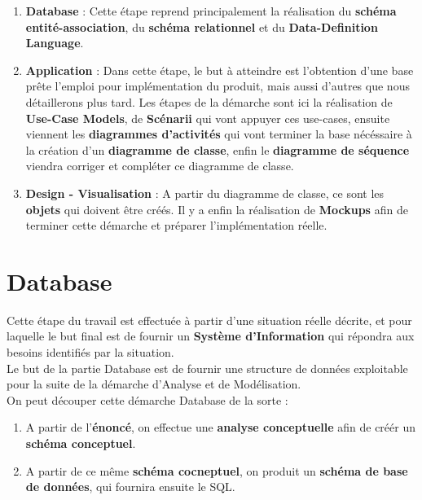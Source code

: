 \documentclass{report}
\begin{document}
		\begin{enumerate}
			\item \textbf{Database} : Cette étape reprend principalement la réalisation du \textbf{schéma entité-association}, du \textbf{schéma relationnel} et du \textbf{Data-Definition Language}.
			\item \textbf{Application} : Dans cette étape, le but à atteindre est l'obtention d'une base prête l'emploi pour implémentation du produit, mais aussi d'autres que nous détaillerons plus tard. Les étapes de la démarche sont ici la réalisation de \textbf{Use-Case Models}, de \textbf{Scénarii} qui vont appuyer ces use-cases, ensuite viennent les \textbf{diagrammes d'activités} qui vont terminer la base nécéssaire à la création d'un \textbf{diagramme de classe}, enfin le \textbf{diagramme de séquence} viendra corriger et compléter ce diagramme de classe.\\
			\item \textbf{Design - Visualisation} : A partir du diagramme de classe, ce sont les \textbf{objets} qui doivent être créés. Il y a enfin la réalisation de \textbf{Mockups} afin de terminer cette démarche et préparer l'implémentation réelle.\\
		\end{enumerate}


\chapter{Database}

	Cette étape du travail est effectuée à partir d'une situation réelle décrite, et pour laquelle le but final est de fournir un \textbf{Système d'Information} qui répondra aux besoins identifiés par la situation.\\

	Le but de la partie Database est de fournir une structure de données exploitable pour la suite de la démarche d'Analyse et de Modélisation.\\

	On peut découper cette démarche Database de la sorte : \\

	\begin{enumerate}
		\item A partir de l'\textbf{énoncé}, on effectue une \textbf{analyse conceptuelle} afin de créér un \textbf{schéma conceptuel}.\\
		\item A partir de ce même \textbf{schéma cocneptuel}, on produit un \textbf{schéma de base de données}, qui fournira ensuite le SQL.\\
	\end{enumerate}
\end{document}
